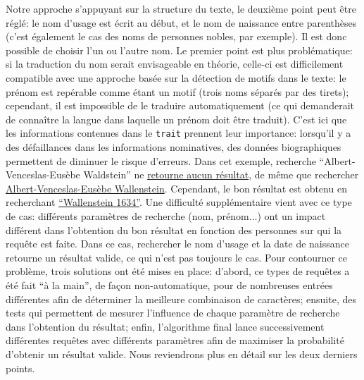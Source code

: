 \documentclass[a4paper, 12pt, twoside]{book}
\newcommand{\ttrait}{\texttt{trait}}
\begin{document}
Notre approche s'appuyant sur la structure du texte, le deuxième point peut être réglé: le nom d'usage est écrit au début, et le nom de naissance entre parenthèses (c'est également le cas des noms de personnes nobles, par exemple). Il est donc possible de choisir l'un ou l'autre nom. Le premier point est plus problématique: si la traduction du nom serait envisageable en théorie, celle-ci est difficilement compatible avec une approche basée sur la détection de motifs dans le texte: le prénom est repérable comme étant un motif (trois noms séparés par des tirets); cependant, il est impossible de le traduire automatiquement (ce qui demanderait de connaître la langue dans laquelle un prénom doit être traduit). C'est ici que les informations contenues dans le \ttrait{} prennent leur importance: lorsqu'il y a des défaillances dans les informations nominatives, des données biographiques permettent de diminuer le risque d'erreurs. Dans cet exemple, recherche \enquote{Albert-Venceslas-Eusèbe Waldstein} ne \href{https://www.wikidata.org/w/index.php?search=Albert-Venceslas-Eus%C3%A8be+de+Waldstein&title=Special:Search&profile=advanced&fulltext=1&ns0=1&ns120=1}{retourne aucun résultat}, de même que rechercher \href{https://www.wikidata.org/w/index.php?search=Albert-Venceslas-Eus%C3%A8be+Wallenstein&title=Special:Search&profile=advanced&fulltext=1&ns0=1&ns120=1}{Albert-Venceslas-Eusèbe Wallenstein}. Cependant, le bon résultat est obtenu en recherchant \href{https://www.wikidata.org/w/index.php?search=Wallenstein+1634&title=Special:Search&profile=advanced&fulltext=1&ns0=1&ns120=1}{\enquote{Wallenstein 1634}}. Une difficulté supplémentaire vient avec ce type de cas: différents paramètres de recherche (nom, prénom...) ont un impact différent dans l'obtention du bon résultat en fonction des personnes sur qui la requête est faite. Dans ce cas, rechercher le nom d'usage et la date de naissance retourne un résultat valide, ce qui n'est pas toujours le cas. Pour contourner ce problème, trois solutions ont été mises en place: d'abord, ce types de requêtes a été fait \enquote{à la main}, de façon non-automatique, pour de nombreuses entrées différentes afin de déterminer la meilleure combinaison de caractères; ensuite, des tests qui permettent de mesurer l'influence de chaque paramètre de recherche dans l'obtention du résultat; enfin, l'algorithme final lance successivement différentes requêtes avec différents paramètres afin de maximiser la probabilité d'obtenir un résultat valide. Nous reviendrons plus en détail sur les deux derniers points.
\end{document}
